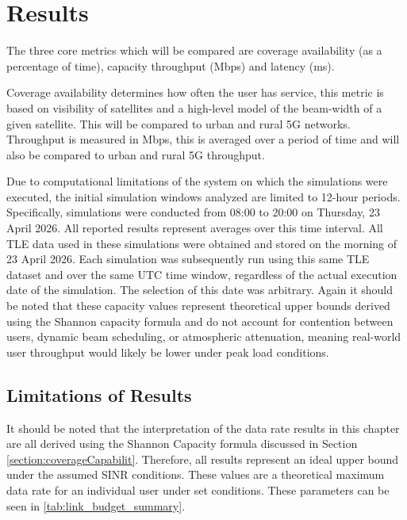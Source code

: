 \chapter{Results} \label{chapter:5}
The three core metrics which will be compared are coverage availability (as a percentage of time), capacity throughput (Mbps) and latency (ms). 

Coverage availability determines how often the user has service, this metric is based on visibility of satellites and a high-level model of the beam-width of a given satellite. This will be compared to urban and rural 5G networks. Throughput is measured in Mbps, this is averaged over a period of time and will also be compared to urban and rural 5G throughput. 

Due to computational limitations of the system on which the simulations were executed, the initial simulation windows analyzed are limited to 12-hour periods. Specifically, simulations were conducted from 08:00 to 20:00 on Thursday, 23 April 2026. All reported results represent averages over this time interval.
All TLE data used in these simulations were obtained and stored on the morning of 23 April 2026. Each simulation was subsequently run using this same TLE dataset and over the same UTC time window, regardless of the actual execution date of the simulation. The selection of this date was arbitrary.
Again it should be noted that these capacity values represent theoretical upper bounds derived using the Shannon capacity formula and do not account for contention between users, dynamic beam scheduling, or atmospheric attenuation, meaning real-world user throughput would likely be lower under peak load conditions.


\section{Limitations of Results}
It should be noted that the interpretation of the data rate results in this chapter are all derived using the Shannon Capacity formula discussed in Section \ref{section:coverageCapabilit}. Therefore, all results represent an ideal upper bound under the assumed SINR conditions. These values are a theoretical maximum data rate for an individual user under set conditions. These parameters can be seen in \ref{tab:link_budget_summary}.

